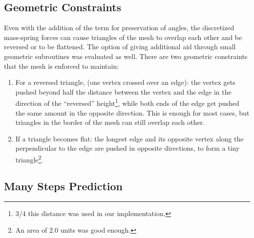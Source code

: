 \documentclass[journal]{IEEEtran}
\begin{document}
\subsection{Geometric Constraints}
Even with the addition of the term for preservation of angles, the discretized mass-spring forces can cause triangles of the mesh to overlap each other and be reversed or to be flattened.  The option of giving additional aid through small geometric subroutines was evaluated as well.  There are two geometric constraints that the mesh is enforced to maintain:

\begin{enumerate}
 \item For a reversed triangle, (one vertex crossed over an edge): the vertex gets pushed beyond half the distance between the vertex and the edge in the direction of the ``reversed'' height\footnote{$3/4$ this distance was used in our implementation.}, while both ends of the edge get pushed the same amount in the opposite direction.  This is enough for most cases, but triangles in the border of the mesh can still overlap each other.

 \item If a triangle becomes flat: the longest edge and its opposite vertex along the perpendicular to the edge are pushed in opposite directions, to form a tiny triangle\footnote{An area of $2.0$ units was good enough.}.
\end{enumerate}

\subsection{Many Steps Prediction}
\label{sec:manysteps}
\end{document}
